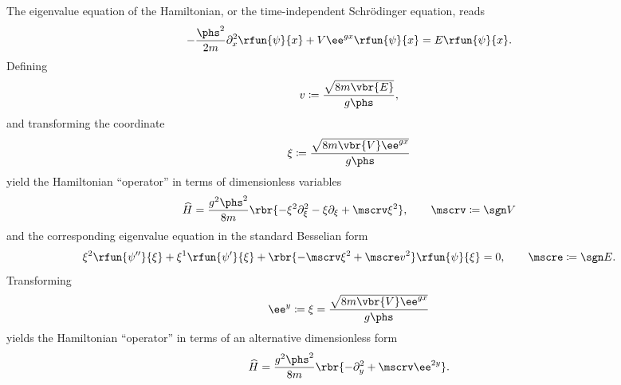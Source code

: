 \documentclass[a4paper,11pt]{article}
\begin{document}
The eigenvalue equation of the Hamiltonian, or the time-independent Schrödinger 
equation, reads
\begin{align}
-\frac{\phs^2}{2m}\partial_x^2 \rfun{\psi}{x} + V\ee^{g x} \rfun{\psi}{x} =
E \rfun{\psi}{x}.
\end{align}
Defining
\begin{align}
v \coloneqq \frac{\sqrt{8m\vbr{E}}}{g\phs},
\end{align}
and transforming the coordinate
\begin{align}
\xi \coloneqq \frac{\sqrt{8m\vbr{V}\ee^{g x}}}{g\phs}
\end{align}
yield the Hamiltonian ``operator'' in terms of dimensionless variables
\begin{align}
\widehat{H} = \frac{g^2\phs^2}{8m}\rbr{-\xi^2\partial_\xi^2 - \xi\partial_\xi + 
\mscrv \xi^2},\qquad \mscrv \coloneqq \sgn V
\end{align}
and the corresponding eigenvalue equation in the standard Besselian form
\begin{align}
\xi^2 \rfun{\psi''}{\xi} + \xi^1 \rfun{\psi'}{\xi} +
\rbr{-\mscrv \xi^2 + \mscre v^2} \rfun{\psi}{\xi} = 0,\qquad
\mscre \coloneqq \sgn E.
\end{align}
Transforming
\begin{align}
\ee^y \coloneqq \xi = \frac{\sqrt{8m\vbr{V}\ee^{g x}}}{g\phs}
\end{align}
yields the Hamiltonian ``operator'' in terms of an alternative dimensionless 
form
\begin{align}
\widehat{H} = \frac{g^2\phs^2}{8m}\rbr{-\partial_y^2 + \mscrv \ee^{2y}}.
\end{align}



\subsection{}


\printbibliography
\end{document}
